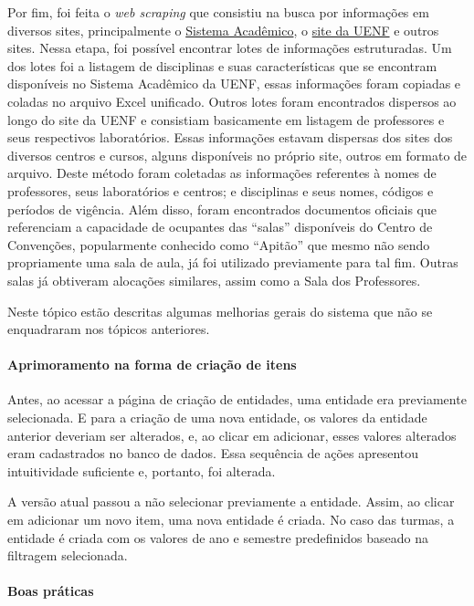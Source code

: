 Por fim, foi feita o \textit{web scraping} que consistiu na busca por informações em diversos sites, principalmente o \href{https://academico.uenf.br/usuarios/sign_in}{Sistema Acadêmico}, o \href{https://uenf.br/portal/}{site da UENF} e outros sites. Nessa etapa, foi possível encontrar lotes de informações estruturadas. Um dos lotes foi a listagem de disciplinas e suas características que se encontram disponíveis no Sistema Acadêmico da UENF, essas informações foram copiadas e coladas no arquivo Excel unificado. Outros lotes foram encontrados dispersos ao longo do site da UENF e consistiam basicamente em listagem de professores e seus respectivos laboratórios. Essas informações estavam dispersas dos sites dos diversos centros e cursos, alguns disponíveis no próprio site, outros em formato de arquivo. Deste método foram coletadas as informações referentes à nomes de professores, seus laboratórios e centros; e disciplinas e seus nomes, códigos e períodos de vigência. Além disso, foram encontrados documentos oficiais que referenciam a capacidade de ocupantes das ``salas'' disponíveis do Centro de Convenções, popularmente conhecido como ``Apitão'' que mesmo não sendo propriamente uma sala de aula, já foi utilizado previamente para tal fim. Outras salas já obtiveram alocações similares, assim como a Sala dos Professores.


Neste tópico estão descritas algumas melhorias gerais do sistema que não se enquadraram nos tópicos anteriores.

\paragraph*{Aprimoramento na forma de criação de itens}

Antes, ao acessar a página de criação de entidades, uma entidade era previamente selecionada. E para a criação de uma nova entidade, os valores da entidade anterior deveriam ser alterados, e, ao clicar em adicionar, esses valores alterados eram cadastrados no banco de dados. Essa sequência de ações apresentou intuitividade suficiente e, portanto, foi alterada.

A versão atual passou a não selecionar previamente a entidade. Assim, ao clicar em adicionar um novo item, uma nova entidade é criada. No caso das turmas, a entidade é criada com os valores de ano e semestre predefinidos baseado na filtragem selecionada.

\paragraph*{Boas práticas}

